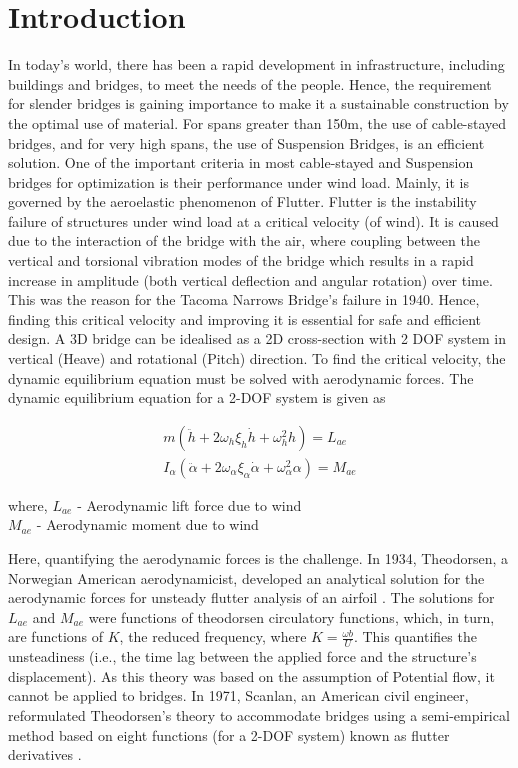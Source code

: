 \documentclass[../main]{subfiles}
\begin{document}
\chapter{Introduction}

In today's world, there has been a rapid development in infrastructure, including buildings and bridges, to meet the needs of the 
people. Hence, the requirement for slender bridges is gaining importance to make it a sustainable construction by the optimal use 
of material. For spans greater than 150m, the use of cable-stayed bridges, and for very high spans, the use of Suspension Bridges, 
is an efficient solution. One of the important criteria in most cable-stayed and Suspension bridges for optimization is their 
performance under wind load. Mainly, it is governed by the aeroelastic phenomenon of Flutter. Flutter is the instability failure 
of structures under wind load at a critical velocity (of wind). It is caused due to the interaction of the bridge with the air, 
where coupling between the vertical and torsional vibration modes of the bridge which results in a rapid increase in amplitude 
(both vertical deflection and angular rotation) over time. This was the reason for the Tacoma Narrows Bridge's failure in 1940. 
Hence, finding this critical velocity and improving it is essential for safe and efficient design. A 3D bridge can be idealised 
as a 2D cross-section with 2 DOF system in vertical (Heave) and rotational (Pitch) direction. To find the critical velocity, 
the dynamic equilibrium equation must be solved with aerodynamic forces. The dynamic equilibrium equation for a 2-DOF system is 
given as

\begin{align}
m(\ddot{h} + 2\omega_h\xi_h\dot{h} + \omega_h^2 h) = L_{ae} \\
I_\alpha( \ddot{\alpha} + 2\omega_\alpha\xi_\alpha\dot{\alpha} + \omega_\alpha^2 \alpha) = M_{ae}
\end{align}

where, $L_{ae}$ - Aerodynamic lift force due to wind \\
\phantom{where,} $M_{ae}$ - Aerodynamic moment due to wind
\vspace{0.5 cm}

Here, quantifying the aerodynamic forces is the challenge. In 1934, Theodorsen, a Norwegian American aerodynamicist, developed an 
analytical solution for the aerodynamic forces for unsteady flutter analysis of an airfoil \cite{TheodorsenGarrick1934}. The solutions for $L_{ae}$ and 
$M_{ae}$ were functions of theodorsen circulatory functions, which, in turn, are functions of $K$, the reduced frequency, where 
$K = \frac{\omega b}{U}$. This quantifies the unsteadiness (i.e., the time lag between the applied force and the structure's 
displacement). As this theory was based on the assumption of Potential flow, it cannot be applied to bridges. In 1971, Scanlan, 
an American civil engineer, reformulated Theodorsen's theory to accommodate bridges using a semi-empirical method based on eight 
functions (for a 2-DOF system) known as flutter derivatives \cite{scanlan1971}.
\end{document}
